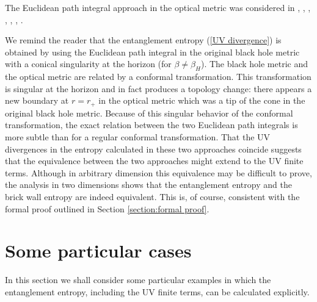 \documentclass[12pt]{article}
\begin{document}
The Euclidean path integral approach in the optical metric was considered in \cite{Barvinsky:1994jca}, \cite{deAlwis:1995}, \cite{deAlwis:1994ej}, \cite{Barbon:1994ej}, \cite{Barbon:1994wa}, \cite{Moretti:1996wd}, \cite{Iellici:1996gv}.
 
We remind the reader that the entanglement entropy (\ref{UV divergence}) is obtained by using the Euclidean path integral in the original black hole metric with a conical singularity
at the horizon (for $\beta\neq \beta_H$). The black hole metric and the optical metric are related by a conformal transformation.  This transformation is singular at the horizon and in fact produces a topology change: there appears a new boundary at $r=r_+$ in the optical metric which was a tip of the cone in the original black hole metric.  Because of this singular behavior of the conformal transformation, the exact relation between the two Euclidean path integrals is more subtle than for a regular conformal transformation. That the UV divergences in the entropy calculated  in these two approaches coincide suggests that the equivalence between the two approaches might  extend to the UV finite terms. Although in arbitrary dimension 
this equivalence may be difficult to prove, the analysis in two dimensions \cite{Solodukhin:1996vx} shows that the entanglement entropy and the brick wall entropy are indeed equivalent. 
 This is, of course, consistent with the formal proof outlined in Section \ref{section:formal proof}. 
                             

 

\section{Some particular cases}
In this section we shall consider some particular examples in which the entanglement entropy, including the UV finite terms, can be calculated explicitly.
\end{document}
